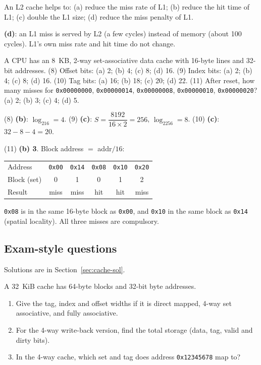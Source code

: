 \begin{exercise}[Lecturer 2]
An L2 cache helps to: (a) reduce the miss rate of L1; (b) reduce the hit time of
L1; (c) double the L1 size; (d) reduce the miss penalty of L1.
\end{exercise}
\begin{solution}
\textbf{(d)}: an L1 miss is served by L2 (a few cycles) instead of memory (about
100 cycles). L1's own miss rate and hit time do not change.
\end{solution}

\begin{exercise}[Lecturer 8--11]\label{l:cache-trace}
A CPU has an 8~KB, 2-way set-associative data cache with 16-byte lines and 32-bit
addresses.
(8) Offset bits: (a) 2; (b) 4; (c) 8; (d) 16.
(9) Index bits: (a) 2; (b) 4; (c) 8; (d) 16.
(10) Tag bits: (a) 16; (b) 18; (c) 20; (d) 22.
(11) After reset, how many misses for \texttt{0x00000000}, \texttt{0x00000014},
\texttt{0x00000008}, \texttt{0x00000010}, \texttt{0x00000020}? (a) 2; (b) 3; (c) 4;
(d) 5.
\end{exercise}
\begin{solution}
(8) \textbf{(b)}: $\log_216=4$. (9) \textbf{(c)}: $S=\dfrac{8192}{16\times2}=256$,
$\log_2256=8$. (10) \textbf{(c)}: $32-8-4=20$.

(11) \textbf{(b) 3}. Block address $=$ addr$/16$:
\begin{center}
\small
\begin{tabular}{@{}lccccc@{}}
\toprule
Address & \texttt{0x00} & \texttt{0x14} & \texttt{0x08} & \texttt{0x10} & \texttt{0x20} \\
Block (set) & 0 & 1 & 0 & 1 & 2 \\
Result & miss & miss & hit & hit & miss \\
\bottomrule
\end{tabular}
\end{center}
\texttt{0x08} is in the same 16-byte block as \texttt{0x00}, and \texttt{0x10} in the
same block as \texttt{0x14} (spatial locality). All three misses are compulsory.
\end{solution}

\subsection{Exam-style questions}
Solutions are in Section~\ref{sec:cache-sol}.

\begin{exercise}\label{q:c-addr}
A 32~KiB cache has 64-byte blocks and 32-bit byte addresses.
\begin{enumerate}[label=(\alph*),leftmargin=*]
  \item Give the tag, index and offset widths if it is direct mapped, 4-way set
  associative, and fully associative.
  \item For the 4-way write-back version, find the total storage (data, tag, valid
  and dirty bits).
  \item In the 4-way cache, which set and tag does address \texttt{0x12345678} map
  to?
\end{enumerate}
\end{exercise}

